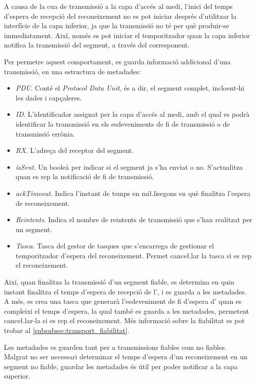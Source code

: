 \documentclass{tfgitic}[2024/07/01]
\begin{document}
{A causa de la cua de transmissió a la capa d'accés al medi, l'inici del temps d'espera de recepció del reconeixement no es pot iniciar després d'utilitzar la interfície de la capa inferior, ja que la transmissió no té per què produir-se immediatament. Així, només es pot iniciar el temporitzador quan la capa inferior notifica la transmissió del segment, a través del  corresponent.

Per permetre aquest comportament, es guarda informació addicional d'una transmissió, en una estructura de metadades:
\begin{itemize}
    \item \emph{PDU}. Conté el \emph{Protocol Data Unit}, és a dir, el segment complet, incloent-hi les dades i capçaleres.
    \item \emph{ID}. L'identificador assignat per la capa d'accés al medi, amb el qual es podrà identificar la transmissió en els esdeveniments de fi de transmissió o de transmissió errònia.
    \item \emph{RX}. L'adreça del receptor del segment.
    \item \emph{isSent}. Un booleà per indicar si el segment ja s'ha enviat o no. S'actualitza quan es rep la notificació de fi de transmissió.
    \item \emph{ackTimeout}. Indica l'instant de temps en mi\l.lisegons en què finalitza l'espera de reconeixement. 
    \item \emph{Reintents}. Indica el nombre de reintents de transmissió que s'han realitzat per un segment.
    \item \emph{Tasca}. Tasca del gestor de tasques que s'encarrega de gestionar el temporitzador d'espera del reconeixement. Permet cance\l.lar la tasca si es rep el reconeixement.
\end{itemize}

Així, quan finalitza la transmissió d'un segment fiable, es determina en quin instant finalitza el temps d'espera de recepció de l', i es guarda a les metadades. A més, es crea una tasca que generarà l'esdeveniment de fi d'espera d' quan es compleixi el temps d'espera, la qual també es guarda a les metadades, permetent cance\l.lar-la si es rep el reconeixement. Més informació sobre la fiabilitat es pot trobar al \autoref{subsubsec:transport_fiabilitat}.

Les metadades es guarden tant per a transmissions fiables com no fiables. Malgrat no ser necessari determinar el temps d'espera d'un reconeixement en un segment no fiable, guardar les metadades és útil per poder notificar a la capa superior.

}
\end{document}
